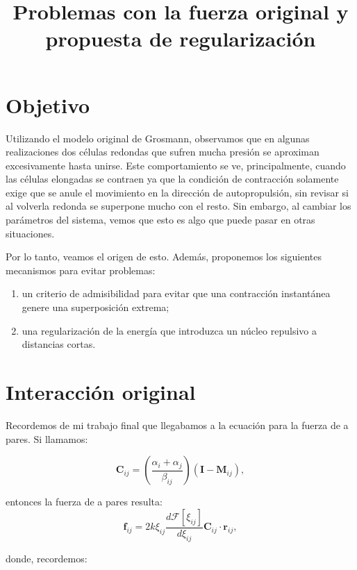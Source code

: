 \documentclass[11pt,a4paper]{article}
\title{Problemas con la fuerza original y propuesta de regularización}
\author{}
\date{}
\begin{document}
\maketitle

\section{Objetivo}

Utilizando el modelo original de Grosmann, observamos que en algunas realizaciones dos células redondas que sufren mucha presión se aproximan excesivamente hasta unirse. Este comportamiento se ve, principalmente, cuando las células elongadas se contraen ya que la condición de contracción solamente exige que se anule el movimiento en la dirección de autopropulsión, sin revisar si al volverla redonda se superpone mucho con el resto. Sin embargo, al cambiar los parámetros del sistema, vemos que esto es algo que puede pasar en otras situaciones.


Por lo tanto, veamos el origen de esto. Además, proponemos los siguientes mecanismos para evitar problemas:

\begin{enumerate}
    \item un criterio de admisibilidad para evitar que una contracción instantánea genere una superposición extrema;
    \item una regularización de la energía que introduzca un núcleo repulsivo a distancias cortas.
\end{enumerate}

\section{Interacción original}

Recordemos de mi trabajo final que llegabamos a la ecuación para la fuerza de a pares. Si llamamos:

\begin{equation}
	\mathbf C_{ij}= \left(\frac{\alpha_i + \alpha_j}{\beta_{ij}}\right)(\mathbf{I}-\mathbf{M}_{ij}),
	\label{C_ij}
\end{equation}

entonces la fuerza de a pares resulta:
\begin{equation}
	\mathbf{f}_{ij}
	=
	2 k \xi_{ij} \frac{d\mathcal{F}[\xi_{ij}]}{d\xi_{ij}}\mathbf C_{ij}  \cdot \mathbf{r}_{ij},
	\label{eq:force_general}
\end{equation}

donde, recordemos: 
\end{document}
